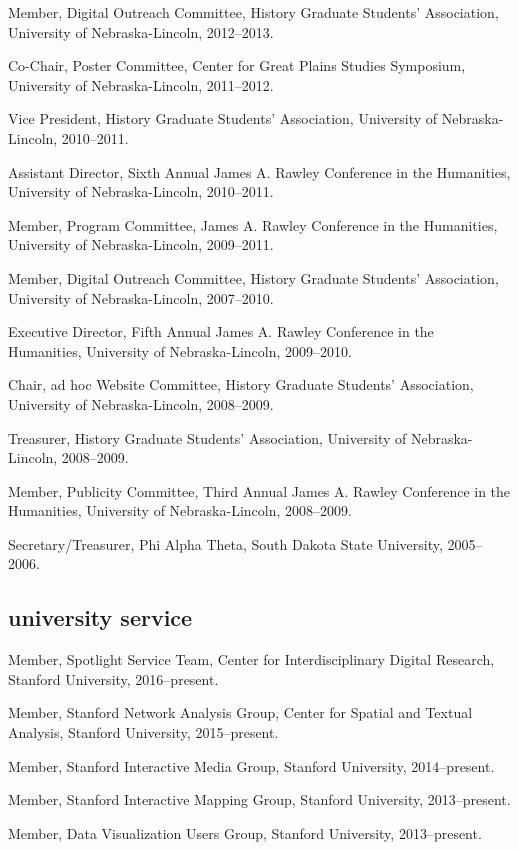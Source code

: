 Member, Digital Outreach Committee, History Graduate Students'
Association, University of Nebraska-Lincoln, 2012--2013.

Co-Chair, Poster Committee, Center for Great Plains Studies Symposium,
University of Nebraska-Lincoln, 2011--2012.

Vice President, History Graduate Students' Association, University of
Nebraska-Lincoln, 2010--2011.

Assistant Director, Sixth Annual James A. Rawley Conference in the
Humanities, University of Nebraska-Lincoln, 2010--2011.

Member, Program Committee, James A. Rawley Conference in the Humanities,
University of Nebraska-Lincoln, 2009--2011.

Member, Digital Outreach Committee, History Graduate Students'
Association, University of Nebraska-Lincoln, 2007--2010.

Executive Director, Fifth Annual James A. Rawley Conference in the
Humanities, University of Nebraska-Lincoln, 2009--2010.

Chair, ad hoc Website Committee, History Graduate Students' Association,
University of Nebraska-Lincoln, 2008--2009.

Treasurer, History Graduate Students' Association, University of
Nebraska-Lincoln, 2008--2009.

Member, Publicity Committee, Third Annual James A. Rawley Conference in
the Humanities, University of Nebraska-Lincoln, 2008--2009.

Secretary/Treasurer, Phi Alpha Theta, South Dakota State University,
2005--2006.

\subsection{university service}\label{university-service}

Member, Spotlight Service Team, Center for Interdisciplinary Digital
Research, Stanford University, 2016--present.

Member, Stanford Network Analysis Group, Center for Spatial and Textual
Analysis, Stanford University, 2015--present.

Member, Stanford Interactive Media Group, Stanford University,
2014--present.

Member, Stanford Interactive Mapping Group, Stanford University,
2013--present.

Member, Data Visualization Users Group, Stanford University,
2013--present.


